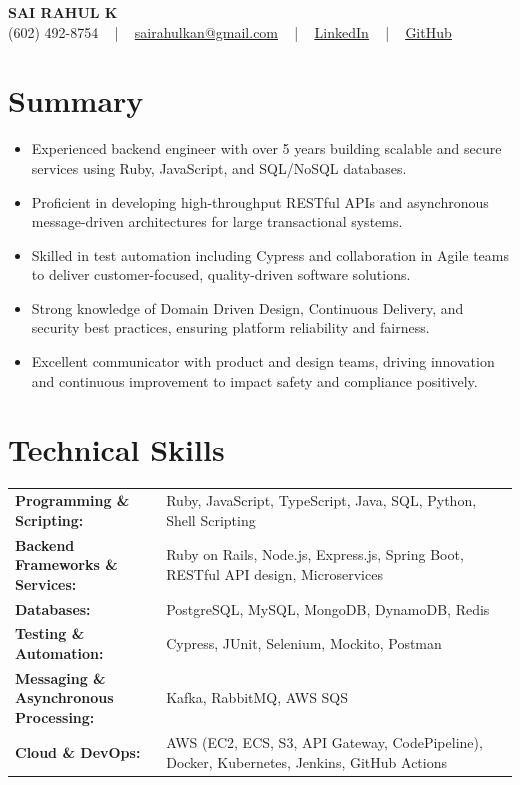 \documentclass[letterpaper,11pt]{article}
\newcommand{\resumeItem}[1]{
  \item\footnotesize{
    {#1 \vspace{-2pt}}
  }
}
\newcommand{\resumeItemListStart}{\begin{itemize}[leftmargin=*]}
\newcommand{\resumeItemListEnd}{\end{itemize}\vspace{-5pt}}
\begin{document}
\begin{center}
    {\fontsize{14pt}{12pt}\selectfont \textbf{\MakeUppercase{Sai Rahul K}}}\\ \vspace{2pt}
    \fontsize{10pt}{12pt}\selectfont (602) 492-8754 ~ | ~ \href{mailto:sairahulkan@gmail.com}{sairahulkan@gmail.com} ~ | ~
    \href{https://www.linkedin.com/in/rq123/}{\color{blue}\underline{LinkedIn}} ~ | ~
    \href{https://github.com/kanrahuldo}{\color{blue}\underline{GitHub}}~
    \vspace{-8pt}
\end{center}

\section{Summary}
\fontsize{9pt}{10pt}\selectfont
\resumeItemListStart
    \resumeItem{Experienced backend engineer with over 5 years building scalable and secure services using Ruby, JavaScript, and SQL/NoSQL databases.}
    \resumeItem{Proficient in developing high-throughput RESTful APIs and asynchronous message-driven architectures for large transactional systems.}
    \resumeItem{Skilled in test automation including Cypress and collaboration in Agile teams to deliver customer-focused, quality-driven software solutions.}
    \resumeItem{Strong knowledge of Domain Driven Design, Continuous Delivery, and security best practices, ensuring platform reliability and fairness.}
    \resumeItem{Excellent communicator with product and design teams, driving innovation and continuous improvement to impact safety and compliance positively.}
\resumeItemListEnd
\vspace{-6pt}

\section{Technical Skills}
        \vspace{-14pt}
        \begin{table}[h]
            \fontsize{9pt}{10pt}\selectfont
            \begin{tabular}{p{0.3\linewidth} p{0.7\linewidth}}
                \textbf{Programming \& Scripting:} & Ruby, JavaScript, TypeScript, Java, SQL, Python, Shell Scripting \\
                \textbf{Backend Frameworks \& Services:} & Ruby on Rails, Node.js, Express.js, Spring Boot, RESTful API design, Microservices \\
                \textbf{Databases:} & PostgreSQL, MySQL, MongoDB, DynamoDB, Redis \\
                \textbf{Testing \& Automation:} & Cypress, JUnit, Selenium, Mockito, Postman \\
                \textbf{Messaging \& Asynchronous Processing:} & Kafka, RabbitMQ, AWS SQS \\
                \textbf{Cloud \& DevOps:} & AWS (EC2, ECS, S3, API Gateway, CodePipeline), Docker, Kubernetes, Jenkins, GitHub Actions \\
            \end{tabular}
        \end{table}
    \vspace{-15pt}
\end{document}
